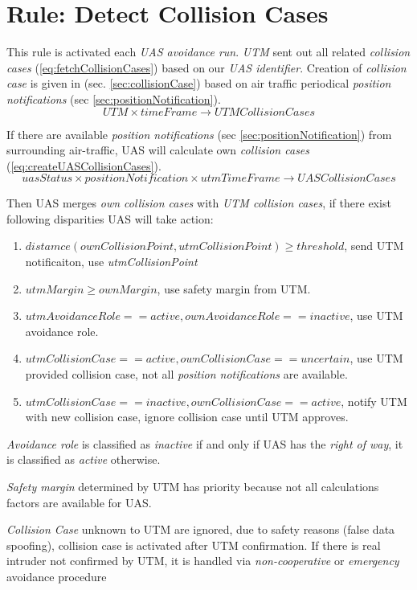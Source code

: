 \section{Rule: Detect Collision Cases}\label{sec:detectCollisionCases}
\noindent This rule is activated each \emph{UAS avoidance run}. \emph{UTM} sent out all related \emph{collision cases} (\ref{eq:fetchCollisionCases}) based on our \emph{UAS identifier}. Creation of \emph{collision case} is given in (sec. \ref{sec:collisionCase}) based on air traffic periodical \emph{position notifications} (sec \ref{sec:positionNotification}).
\begin{equation}\label{eq:fetchCollisionCases}
    UTM\times timeFrame \to UTMCollisionCases
\end{equation}

\noindent If there are available \emph{position notifications} (sec \ref{sec:positionNotification}) from surrounding air-traffic, UAS will calculate own \emph{collision cases} (\ref{eq:createUASCollisionCases}).
\begin{equation}\label{eq:createUASCollisionCases}
    uasStatus\times positionNotification\times utmTimeFrame\to UASCollisionCases
\end{equation}

\noindent Then UAS merges \emph{own collision cases} with \emph{UTM collision cases}, if there exist following disparities UAS will take action:
\begin{enumerate}
    \item $distamce(ownCollisionPoint,utmCollisionPoint)\ge threshold$, send UTM notificaiton, use \emph{utmCollisionPoint}
    \item $utmMargin \ge ownMargin$, use safety margin from UTM.
    \item $utmAvoidanceRole == active, ownAvoidanceRole == inactive$, use UTM avoidance role.
    \item $utmCollisionCase == active, ownCollisionCase == uncertain$, use UTM provided collision case, not all \emph{position notifications} are available. 
    \item $utmCollisionCase == inactive, ownCollisionCase == active$, notify UTM with new collision case, ignore collision case until UTM approves.
\end{enumerate}
\begin{note}
    \emph{Avoidance role} is classified as \emph{inactive} if and only if UAS has the  \emph{right of way}, it is classified as \emph{active} otherwise.
    
    \emph{Safety margin} determined by UTM has priority because not all calculations factors are available for UAS.
    
    \emph{Collision Case} unknown to UTM are ignored, due to safety reasons (false data spoofing), collision case is activated after UTM confirmation. If there is real intruder not confirmed by UTM, it is handled via \emph{non-cooperative} or \emph{emergency} avoidance procedure
\end{note}

